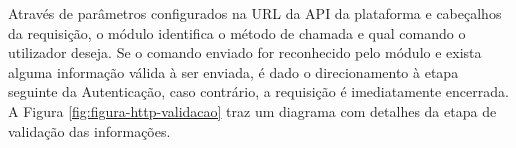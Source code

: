         \begin{figure}[!h]
    	\end{figure}
    	
    	\begin{figure}[!h]
    	\end{figure}
    	
    	 Através de parâmetros configurados na \gls{URL} da \gls{API} da plataforma e cabeçalhos da requisição, o módulo identifica o método de chamada e qual comando o utilizador deseja. Se o comando enviado for reconhecido pelo módulo e exista alguma informação válida à ser enviada, é dado o direcionamento à etapa seguinte da Autenticação, caso contrário, a requisição é imediatamente encerrada. A Figura \ref{fig:figura-http-validacao} traz um diagrama com detalhes da etapa de validação das informações.
    	 
